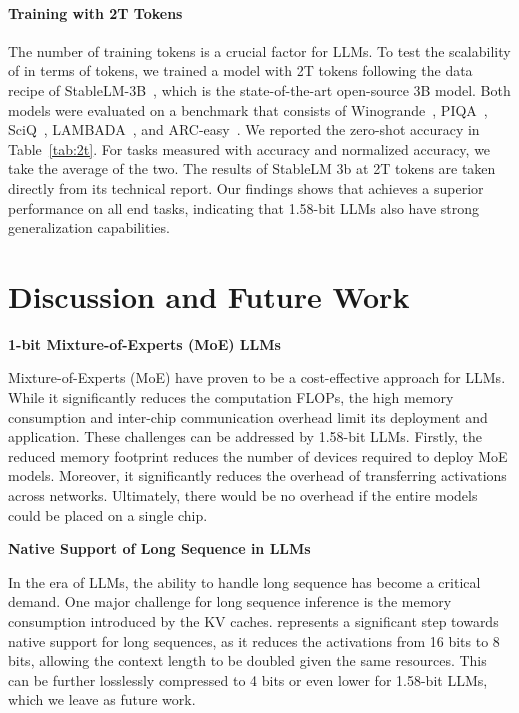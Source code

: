 \paragraph{Training with 2T Tokens}

The number of training tokens is a crucial factor for LLMs. To test the scalability of  in terms of tokens, we trained a  model with 2T tokens following the data recipe of StableLM-3B~\cite{StableLM-3B-4E1T}, which is the state-of-the-art open-source 3B model. Both models were evaluated on a benchmark that consists of Winogrande~\cite{winoGrande}, PIQA~\cite{piqa}, SciQ~\cite{sciq}, LAMBADA~\cite{lambada}, and ARC-easy~\cite{arc}. We reported the zero-shot accuracy in Table~\ref{tab:2t}. For tasks measured with accuracy and normalized accuracy, we take the average of the two. The results of StableLM 3b at 2T tokens are taken directly from its technical report. Our findings shows that  achieves a superior performance on all end tasks, indicating that 1.58-bit LLMs also have strong generalization capabilities.

\section{Discussion and Future Work}

\textbf{1-bit Mixture-of-Experts (MoE) LLMs}

Mixture-of-Experts (MoE) have proven to be a cost-effective approach for LLMs. While it significantly reduces the computation FLOPs, the high memory consumption and inter-chip communication overhead limit its deployment and application. These challenges can be addressed by 1.58-bit LLMs. Firstly, the reduced memory footprint reduces the number of devices required to deploy MoE models. Moreover, it significantly reduces the overhead of transferring activations across networks. Ultimately, there would be no overhead if the entire models could be placed on a single chip.

\textbf{Native Support of Long Sequence in LLMs}

In the era of LLMs, the ability to handle long sequence has become a critical demand. One major challenge for long sequence inference is the memory consumption introduced by the KV caches.  represents a significant step towards native support for long sequences, as it reduces the activations from 16 bits to 8 bits, allowing the context length to be doubled given the same resources. This can be further losslessly compressed to 4 bits or even lower for 1.58-bit LLMs, which we leave as future work.

